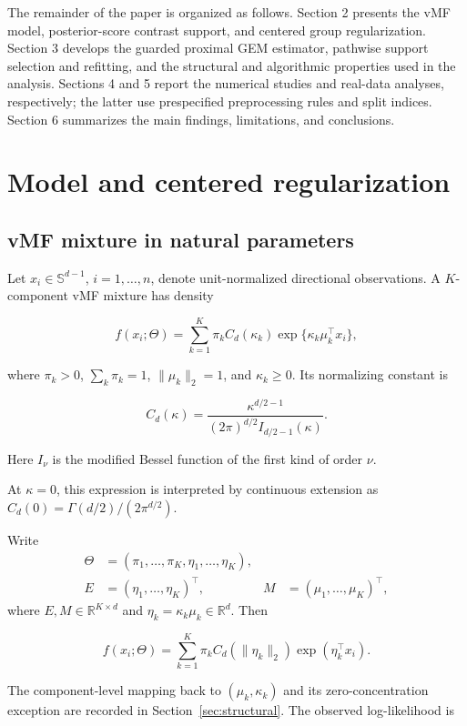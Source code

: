 \documentclass[preprint,12pt,authoryear]{elsarticle}
\newcounter{algorithm}
\begin{document}
The remainder of the paper is organized as follows. Section 2 presents the vMF
model, posterior-score contrast support, and centered group regularization. Section 3
develops the guarded proximal GEM estimator, pathwise support selection and
refitting, and the
structural and algorithmic properties used in the analysis. Sections 4 and 5
report the numerical studies and real-data analyses, respectively; the latter
use prespecified preprocessing rules and split indices.
Section 6 summarizes the main findings, limitations, and conclusions.

\section{Model and centered regularization}

\subsection{vMF mixture in natural parameters}

Let $x_i\in\mathbb S^{d-1}$, $i=1,\ldots,n$, denote unit-normalized
directional observations. A $K$-component vMF mixture has density

\[
f(x_i;\Theta)
=\sum_{k=1}^K\pi_k C_d(\kappa_k)
\exp\{\kappa_k\mu_k^\top x_i\},
\]

where $\pi_k>0$, $\sum_k\pi_k=1$, $\lVert\mu_k\rVert_2=1$, and
$\kappa_k\geq0$. Its normalizing constant is

\[
C_d(\kappa)
=\frac{\kappa^{d/2-1}}
{(2\pi)^{d/2}I_{d/2-1}(\kappa)}.
\]

Here $I_\nu$ is the modified Bessel function of the first kind of order $\nu$.

At $\kappa=0$, this expression is interpreted by continuous extension as
$C_d(0)=\Gamma(d/2)/(2\pi^{d/2})$.

Write
\[
\begin{aligned}
\Theta&=(\pi_1,\ldots,\pi_K,\eta_1,\ldots,\eta_K),\\
E&=(\eta_1,\ldots,\eta_K)^\top,
&M&=(\mu_1,\ldots,\mu_K)^\top,
\end{aligned}
\]
where $E,M\in\mathbb R^{K\times d}$ and
$\eta_k=\kappa_k\mu_k\in\mathbb R^d$. Then

\[
f(x_i;\Theta)
=\sum_{k=1}^K\pi_k C_d(\lVert\eta_k\rVert_2)
\exp(\eta_k^\top x_i).
\]

The component-level mapping back to $(\mu_k,\kappa_k)$ and its
zero-concentration exception are recorded in Section~\ref{sec:structural}. The
observed log-likelihood is
\end{document}
